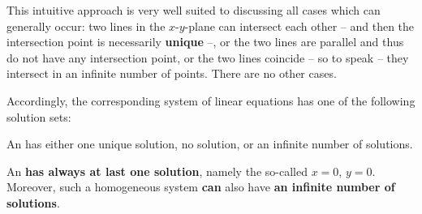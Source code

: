 \begin{MIntro}
This intuitive approach is very well suited to discussing all cases which can generally occur: two
lines in the $x$-$y$-plane can intersect each other -- and then the intersection point is 
necessarily \textbf{unique} --, or the two lines are parallel and thus do not have any
intersection point, or the two lines coincide -- so to speak -- they intersect in 
an infinite number of points. There are no other cases.

Accordingly, the corresponding system of linear equations has one of the following solution sets: 

\begin{MInfo}
An  
has either one unique solution, no solution, or an infinite number of solutions.

An   
\textbf{has always at last one solution}, namely the so-called 
 $x = 0$, $y = 0$.
Moreover, such a homogeneous system \textbf{can} also have \textbf{an infinite number of solutions}.
\end{MInfo}


\end{MIntro}
